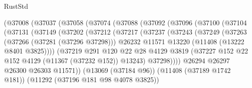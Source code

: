 \begin{lexlean}{RustStd}
\begin{coremodule}
                      (@37008
                        (@37037
                          (@37058
                            (@37074
                              (@37088
                                (@37092
                                  (@37096
                                    (@37100
                                      (@37104
                                        (@37131
                                          (@37149
                                            (@37202
                                              (@37212
                                                (@37217
                                                  (@37237
                                                    (@37243
                                                      (@37249
                                                        (@37263
                                                          (@37266 (@37281 (@37296 @37298)))
                                                          @26232
                                                          @11571
                                                          @13220
                                                          (@11408 (@13222 @8401 @3825))))
                                                      (@37219
                                                        @291
                                                        @120
                                                        @22
                                                        @28
                                                        @4129
                                                        @3819
                                                        (@37227
                                                          @152
                                                          @22
                                                          @152
                                                          @4129
                                                          (@11367 (@37232 @152))
                                                          @13243)
                                                        @37298))))
                                                @26294
                                                @26297
                                                @26300
                                                @26303
                                                @11571))
                                            (@13069 (@37184 @96))
                                            (@11408 (@37189 @1742 @181))
                                            (@11292 (@37196 @181 @98 @4078 @3825))

\end{coremodule}
\end{lexlean}
